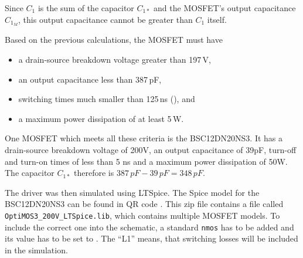 Since \(C_1\) is the sum of the capacitor \(C_{1*}\) and the MOSFET's output capacitance \(C_{1_M}\), %
this output capacitance cannot be greater than \(C_1\) itself.

Based on the previous calculations, the MOSFET must have

\begin{itemize}
    \item a drain-source breakdown voltage greater than 197\,V,
    \item an output capacitance less than 387\,pF,
    \item switching times much smaller than 125\,ns (), and
    \item a maximum power dissipation of at least 5\,W.
\end{itemize}

One MOSFET which meets all these criteria is the BSC12DN20NS3. It has a drain-source breakdown voltage of 200V, an output capacitance of 39pF, turn-off and turn-on times of less than 5 ns and a maximum power dissipation of 50W. The capacitor \(C_{1*}\) therefore is \(387\,pF - 39\,pF = 348\,pF\).

The driver was then simulated using LTSpice. The Spice model for the BSC12DN20NS3 can be found in QR code . This zip file contains a file called \texttt{OptiMOS3\_200V\_LTSpice.lib}, which contains multiple MOSFET models. To include the correct one into the schematic, a standard \texttt{nmos} has to be added and its value has to be set to . The \enquote{L1} means, that switching losses will be included in the simulation.

